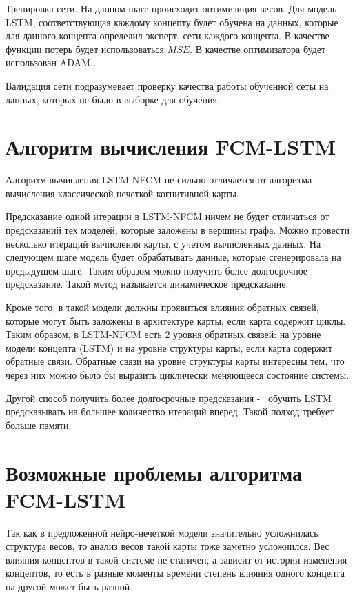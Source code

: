 Тренировка сети. На данном шаге происходит оптимизиция весов.
Для модель LSTM, соответствующая каждому концепту будет обучена
на данных, которые для данного концепта определил эксперт.
сети каждого концепта. В качестве функции потерь будет использоваться $ MSE $.
В качестве оптимизатора будет использован ADAM \cite{adam2014}.

Валидация сети подразумевает
проверку качества работы обученной сеты на данных,
которых не было в выборке для обучения.

\section{Алгоритм вычисления FCM-LSTM}

Алгоритм вычисления LSTM-NFCM не сильно отличается от
алгоритма вычисления классической нечеткой когнитивной карты.

Предсказание одной итерации в LSTM-NFCM ничем не будет отличаться
от предсказаний тех моделей, которые заложены в вершины графа.
Можно провести несколько итераций вычисления карты, с учетом вычисленных
данных. На следующем шаге модель будет обрабатывать данные,
которые сгенерировала на предыдущем шаге. Таким образом можно получить
более долгосрочное предсказание. Такой метод называется динамическое предсказание.

Кроме того, в такой модели должны проявиться влияния обратных связей, которые могут
быть заложены в архитектуре карты, если карта содержит циклы.
Таким образом, в LSTM-NFCM есть 2 уровня обратных связей:
на уровне модели концепта (LSTM) и на уровне структуры карты,
если карта содержит обратные связи.
Обратные связи на уровне структуры карты интересны тем, что
через них можно было бы выразить циклически меняющееся состояние системы.

Другой способ получить более долгосрочные предсказания -~ обучить LSTM
предсказывать на большее количество итераций вперед. Такой подход
требует больше памяти.

\section{Возможные проблемы алгоритма FCM-LSTM}

Так как в предложенной нейро-нечеткой модели
значительно усложнилась структура весов, то
анализ весов такой карты тоже заметно усложнился.
Вес влияния концептов в такой системе не статичен,
а зависит от истории изменения концептов, то есть
в разные моменты времени степень влияния одного концепта
на другой может быть разной.

